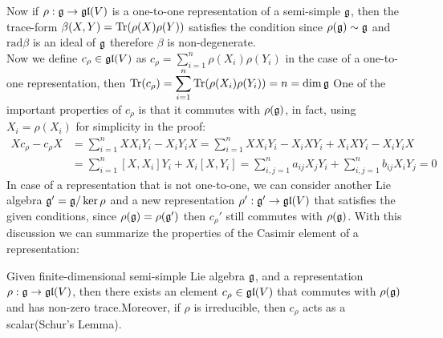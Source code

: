 Now if $\rho:\mathfrak{g} \rightarrow \mathfrak{gl}(V)$ is a one-to-one representation of a semi-simple $\mathfrak{g}$, then the trace-form $\beta(X,Y)=\text{Tr}(\rho(X)\rho(Y))$ satisfies the condition since $\rho(\mathfrak{g}) \sim \mathfrak{g}$ and $\text{rad} \beta$ is an ideal of $\mathfrak{g}$ therefore $\beta$ is non-degenerate.\\
Now we define $c_\rho \in \mathfrak{gl}(V)$ as $c_\rho = \displaystyle\sum_{i=1}^n \rho(X_i)\rho(Y_i)$ in the case of a one-to-one representation, then $\text{Tr}(c_\rho) = \displaystyle \sum_{i=1}^n\text{Tr}(\rho(X_i)\rho(Y_i))= n = \dim \mathfrak{g}$
One of the important properties of $c_\rho$ is that it commutes with $\rho(\mathfrak{g})$, in fact, using $X_i=\rho(X_i)$ for simplicity in the proof:
\begin{align*}
Xc_\rho - c_\rho X &= \sum_{i=1}^n XX_iY_i - X_iY_iX = \sum_{i=1}^nXX_iY_i - X_iXY_i + X_iXY_i - X_iY_iX  \\
&=  \sum_{i=1}^n [X,X_i]Y_i + X_i[X,Y_i] = \sum_{i,j=1}^n a_{ij}X_jY_i + \sum_{i,j=1}^n b_{ij}X_iY_j = 0
\end{align*}
In case of a representation that is not one-to-one, we can consider another Lie algebra $\mathfrak{g}'=\mathfrak{g}/\ker \rho$ and a new representation $\rho': \mathfrak{g}' \rightarrow \mathfrak{gl}(V)$ that satisfies the given conditions, since $\rho(\mathfrak{g})=\rho(\mathfrak{g}')$ then $c_\rho'$ still commutes with $\rho(\mathfrak{g})$.
With this discussion we can summarize the properties of the Casimir element of a representation:
\begin{prop}
Given finite-dimensional semi-simple Lie algebra $\mathfrak{g}$, and a representation $\rho:\mathfrak{g}\rightarrow \mathfrak{gl}(V)$, then there exists an element $c_\rho \in \mathfrak{gl}(V)$ that commutes with $\rho(\mathfrak{g})$ and has non-zero trace.Moreover, if $\rho$ is irreducible, then $c_\rho$ acts as a scalar(Schur's Lemma).
\end{prop}
